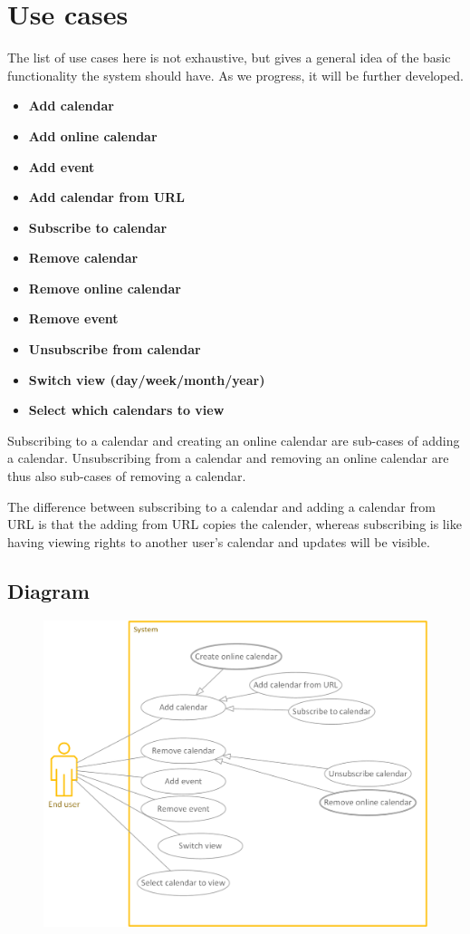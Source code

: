 \documentclass[10pt]{report}
\numberwithin{equation}{section} %
\numberwithin{figure}{section} %
\numberwithin{table}{section} %
\begin{document}
\section{Use cases}
The list of use cases here is not exhaustive, but gives a general idea of the
basic functionality the system should have. As we progress, it will be further
developed.
\begin{itemize}
\item \textbf{Add calendar}
\item \textbf{Add online calendar}
\item \textbf{Add event}
\item \textbf{Add calendar from URL}
\item \textbf{Subscribe to calendar}
\item \textbf{Remove calendar}
\item \textbf{Remove online calendar}
\item \textbf{Remove event}
\item \textbf{Unsubscribe from calendar}
\item \textbf{Switch view (day/week/month/year)}
\item \textbf{Select which calendars to view}
\end{itemize}

Subscribing to a calendar and creating an online calendar are sub-cases of adding a calendar. Unsubscribing from a calendar and removing an online calendar are thus also sub-cases of removing a calendar.

The difference between subscribing to a calendar and adding a calendar from URL is that the adding from URL copies the calender, whereas subscribing is like having viewing rights to another user's calendar and updates will be visible.

\subsection{Diagram}
\begin{figure}
\includegraphics[scale=0.8]{use_case_diagram.png}
\end{figure}
\end{document}
